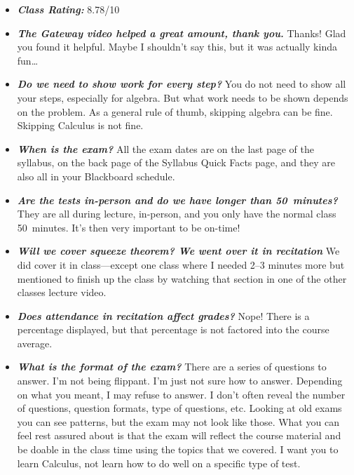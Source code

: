 \documentclass[11pt,letterpaper]{article}
\begin{document}
\begin{itemize}
\item {\bfseries\itshape Class Rating:} 8.78/10

\item {\bfseries\itshape The Gateway video helped a great amount, thank you.} Thanks! Glad you found it helpful. Maybe I shouldn't say this, but it was actually kinda fun\dots

\item {\bfseries\itshape Do we need to show work for every step?} You do not need to show all your steps, especially for algebra. But what work needs to be shown depends on the problem. As a general rule of thumb, skipping algebra can be fine. Skipping Calculus is not fine. 

\item {\bfseries\itshape When is the exam?} All the exam dates are on the last page of the syllabus, on the back page of the Syllabus Quick Facts page, and they are also all in your Blackboard schedule. 

\item {\bfseries\itshape Are the tests in-person and do we have longer than 50~minutes?} They are all during lecture, in-person, and you only have the normal class 50~minutes. It's then very important to be on-time!

\item {\bfseries\itshape Will we cover squeeze theorem? We went over it in recitation} We did cover it in class---except one class where I needed 2--3 minutes more but mentioned to finish up the class by watching that section in one of the other classes lecture video. 

\item {\bfseries\itshape Does attendance in recitation affect grades?} Nope! There is a percentage displayed, but that percentage is not factored into the course average. 

\item {\bfseries\itshape What is the format of the exam?} There are a series of questions to answer. I'm not being flippant. I'm just not sure how to answer. Depending on what you meant, I may refuse to answer. I don't often reveal the number of questions, question formats, type of questions, etc. Looking at old exams you can see patterns, but the exam may not look like those. What you can feel rest assured about is that the exam will reflect the course material and be doable in the class time using the topics that we covered. I want you to learn Calculus, not learn how to do well on a specific type of test. 


\end{itemize}
\end{document}
